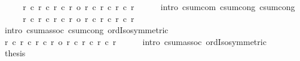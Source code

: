 \begin{isabellebody}
\ \ \isamarkupfalse%
\ \isamarkupfalse%
\ {\isachardoublequoteopen}r{}\ {\isacharplus}{\kern0pt}c\ {\isacharparenleft}{\kern0pt}r{}\ {\isacharplus}{\kern0pt}c\ r{}{\isacharparenright}{\kern0pt}\ {\isacharplus}{\kern0pt}c\ r{}\ {\isacharequal}{\kern0pt}o\ r{}\ {\isacharplus}{\kern0pt}c\ {\isacharparenleft}{\kern0pt}r{}\ {\isacharplus}{\kern0pt}c\ r{}{\isacharparenright}{\kern0pt}\ {\isacharplus}{\kern0pt}c\ r{}{\isachardoublequoteclose}\isanewline
\ \ \ \ \isamarkupfalse%
\ {\isacharparenleft}{\kern0pt}intro\ csum{\isacharunderscore}{\kern0pt}com\ csum{\isacharunderscore}{\kern0pt}cong{}\ csum{\isacharunderscore}{\kern0pt}cong{}{\isacharparenright}{\kern0pt}\isanewline
\ \ \isamarkupfalse%
\ \isamarkupfalse%
\ {\isachardoublequoteopen}r{}\ {\isacharplus}{\kern0pt}c\ {\isacharparenleft}{\kern0pt}r{}\ {\isacharplus}{\kern0pt}c\ r{}{\isacharparenright}{\kern0pt}\ {\isacharplus}{\kern0pt}c\ r{}\ {\isacharequal}{\kern0pt}o\ r{}\ {\isacharplus}{\kern0pt}c\ r{}\ {\isacharplus}{\kern0pt}c\ r{}\ {\isacharplus}{\kern0pt}c\ r{}{\isachardoublequoteclose}\isanewline
\ \ \ \ \isamarkupfalse%
\ {\isacharparenleft}{\kern0pt}intro\ csum{\isacharunderscore}{\kern0pt}assoc\ csum{\isacharunderscore}{\kern0pt}cong{}\ ordIso{\isacharunderscore}{\kern0pt}symmetric{\isacharparenright}{\kern0pt}\isanewline
\ \ \isamarkupfalse%
\ \isamarkupfalse%
\ {\isachardoublequoteopen}r{}\ {\isacharplus}{\kern0pt}c\ r{}\ {\isacharplus}{\kern0pt}c\ r{}\ {\isacharplus}{\kern0pt}c\ r{}\ {\isacharequal}{\kern0pt}o\ {\isacharparenleft}{\kern0pt}r{}\ {\isacharplus}{\kern0pt}c\ r{}{\isacharparenright}{\kern0pt}\ {\isacharplus}{\kern0pt}c\ {\isacharparenleft}{\kern0pt}r{}\ {\isacharplus}{\kern0pt}c\ r{}{\isacharparenright}{\kern0pt}{\isachardoublequoteclose}\isanewline
\ \ \ \ \isamarkupfalse%
\ {\isacharparenleft}{\kern0pt}intro\ csum{\isacharunderscore}{\kern0pt}assoc\ ordIso{\isacharunderscore}{\kern0pt}symmetric{\isacharparenright}{\kern0pt}\isanewline
\ \ \isamarkupfalse%
\ \isamarkupfalse%
\ {\isacharquery}{\kern0pt}thesis\ \isacommand{{\isachardot}{\kern0pt}}\isamarkupfalse%
\isanewline
{}\isamarkupfalse%

\end{isabellebody}
